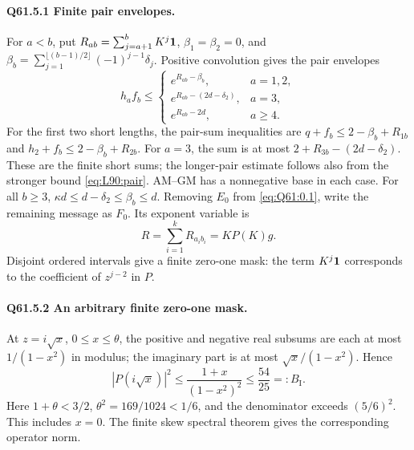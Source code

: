 \paragraph{Q61.5.1 Finite pair envelopes.}
For \(a<\allowbreak b\), put \(R_{ab}=\allowbreak \sum_{j=\allowbreak a+1}^bK^j\mathbf1\),
\(\beta_1=\allowbreak \beta_2=\allowbreak 0\), and
\(\beta_b=\allowbreak \sum_{j=\allowbreak 1}^{\lfloor(b-1)/2\rfloor}(-1)^{j-1}\delta_j\).
Positive convolution gives the pair envelopes
\begin{equation}\tag{Q61.5.1}\label{eq:Q61:5.1}
h_af_b\le
\begin{cases}
e^{R_{ab}-\beta_b},&a=1,2,\\
e^{R_{ab}-(2d-\delta_2)},&a=3,\\
e^{R_{ab}-2d},&a\ge4.
\end{cases}
\end{equation}
For the first two short lengths, the pair-sum inequalities are
\(q+f_b\le\allowbreak 2-\beta_b+R_{1b}\) and
\(h_2+f_b\le\allowbreak 2-\beta_b+R_{2b}\).
For \(a=\allowbreak 3\), the sum is at most \(2+R_{3b}-(2d-\delta_2)\).
These are the finite short sums; the longer-pair estimate follows
also from the stronger bound \eqref{eq:L90:pair}.
AM--GM has a nonnegative base in each case.
For all \(b\ge\allowbreak 3\), \(\kappa d\le\allowbreak  d-\delta_2\le\allowbreak \beta_b\le\allowbreak  d\).
Removing \(E_0\) from \eqref{eq:Q61:0.1}, write the remaining message
as \(F_0\). Its exponent variable is
\begin{equation}\tag{Q61.5.2}\label{eq:Q61:5.2}
R=\sum_{i=1}^kR_{a_ib_i}=KP(K)g.
\end{equation}
Disjoint ordered intervals give a finite zero-one mask: the term
\(K^j\mathbf1\) corresponds to the coefficient of \(z^{j-2}\) in \(P\).

\paragraph{Q61.5.2 An arbitrary finite zero-one mask.}
At \(z=\allowbreak i\sqrt x\), \(0\le\allowbreak  x\le\allowbreak \theta\), the positive and negative
real subsums are each at most \(1/(1-x^2)\) in modulus; the imaginary
part is at most \(\sqrt x/(1-x^2)\). Hence
\begin{equation}\tag{Q61.5.3}\label{eq:Q61:5.3}
|P(i\sqrt x)|^2\le\frac{1+x}{(1-x^2)^2}\le\frac{54}{25}=:B_{\mathrm I}.
\end{equation}
Here \(1+\theta<\allowbreak 3/2\), \(\theta^2=\allowbreak 169/1024<\allowbreak 1/6\), and the
denominator exceeds \((5/6)^2\). This includes \(x=\allowbreak 0\).
The finite skew spectral theorem gives the corresponding operator norm.

